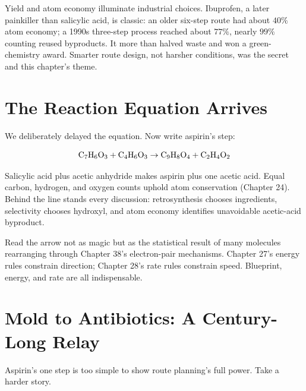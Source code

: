 Yield and atom economy illuminate industrial choices. Ibuprofen, a later painkiller than salicylic acid, is classic: an older six-step route had about $40\%$ atom economy; a 1990s three-step process reached about $77\%$, nearly $99\%$ counting reused byproducts. It more than halved waste and won a green-chemistry award. Smarter route design, not harsher conditions, was the secret and this chapter's theme.

\section{The Reaction Equation Arrives}

We deliberately delayed the equation. Now write aspirin's step:

\[\mathrm{C_7H_6O_3} + \mathrm{C_4H_6O_3} \rightarrow \mathrm{C_9H_8O_4} + \mathrm{C_2H_4O_2}\]

Salicylic acid plus acetic anhydride makes aspirin plus one acetic acid. Equal carbon, hydrogen, and oxygen counts uphold atom conservation (Chapter 24). Behind the line stands every discussion: retrosynthesis chooses ingredients, selectivity chooses hydroxyl, and atom economy identifies unavoidable acetic-acid byproduct.

Read the arrow not as magic but as the statistical result of many molecules rearranging through Chapter 38's electron-pair mechanisms. Chapter 27's energy rules constrain direction; Chapter 28's rate rules constrain speed. Blueprint, energy, and rate are all indispensable.

\section{Mold to Antibiotics: A Century-Long Relay}

Aspirin's one step is too simple to show route planning's full power. Take a harder story.

